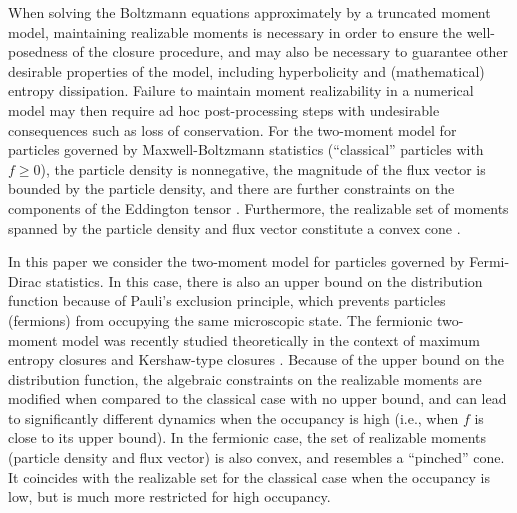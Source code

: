 When solving the Boltzmann equations approximately by a truncated moment model, maintaining realizable moments is necessary in order to ensure the well-posedness of the closure procedure, and may also be necessary to guarantee other desirable properties of the model, including hyperbolicity and (mathematical) entropy dissipation.  
Failure to maintain moment realizability in a numerical model may then require ad hoc post-processing steps with undesirable consequences such as loss of conservation.  
For the two-moment model for particles governed by Maxwell-Boltzmann statistics (``classical'' particles with $f\ge0$), the particle density is nonnegative, the magnitude of the flux vector is bounded by the particle density, and there are further constraints on the components of the Eddington tensor \cite{levermore_1984}.  
Furthermore, the realizable set of moments spanned by the particle density and flux vector constitute a convex cone \cite{olbrant_etal_2012}.  

In this paper we consider the two-moment model for particles governed by Fermi-Dirac statistics.  
In this case, there is also an upper bound on the distribution function because of Pauli's exclusion principle, which prevents particles (fermions) from occupying the same microscopic state.  
The fermionic two-moment model was recently studied theoretically in the context of maximum entropy closures \cite{lareckiBanach_2011,banachLarecki_2013,banachLarecki_2017b} and Kershaw-type closures \cite{banachLarecki_2017a}.  
Because of the upper bound on the distribution function, the algebraic constraints on the realizable moments are modified when compared to the classical case with no upper bound, and can lead to significantly different dynamics when the occupancy is high (i.e., when $f$ is close to its upper bound).  
In the fermionic case, the set of realizable moments (particle density and flux vector) is also convex, and resembles a ``pinched'' cone.  
It coincides with the realizable set for the classical case when the occupancy is low, but is much more restricted for high occupancy.  

